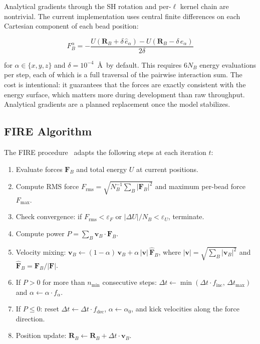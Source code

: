 ﻿\documentclass[11pt]{article}
\begin{document}
Analytical gradients through the SH rotation and per-$\ell$ kernel chain are
nontrivial. The current implementation uses central finite differences on each
Cartesian component of each bead position:

\begin{equation}
\label{eq:fd-forces}
  F_{B}^{\alpha}
    = -\frac{U(\mathbf{R}_B + \delta\,\hat{e}_\alpha)
           - U(\mathbf{R}_B - \delta\,\hat{e}_\alpha)}{2\delta}
\end{equation}

for $\alpha \in \{x, y, z\}$ and $\delta = 10^{-4}$~\AA\ by default. This
requires $6N_B$ energy evaluations per step, each of which is a full
traversal of the pairwise interaction sum. The cost is intentional: it
guarantees that the forces are exactly consistent with the energy surface,
which matters more during development than raw throughput. Analytical
gradients are a planned replacement once the model stabilizes.

\subsection{FIRE Algorithm}

The FIRE procedure~\cite{Bitzek2006} adapts the following steps at each
iteration $t$:

\begin{enumerate}[label=\arabic*.]
  \item Evaluate forces $\mathbf{F}_B$ and total energy $U$ at current
        positions.
  \item Compute RMS force $F_{\mathrm{rms}} = \sqrt{N_B^{-1} \sum_B |\mathbf{F}_B|^2}$
        and maximum per-bead force $F_{\max}$.
  \item Check convergence: if $F_{\mathrm{rms}} < \varepsilon_F$ or
        $|\Delta U|/N_B < \varepsilon_U$, terminate.
  \item Compute power $P = \sum_B \mathbf{v}_B \cdot \mathbf{F}_B$.
  \item Velocity mixing:
        $\mathbf{v}_B \leftarrow
          (1 - \alpha)\,\mathbf{v}_B
          + \alpha\,|\mathbf{v}|\,\hat{\mathbf{F}}_B$,
        where $|\mathbf{v}| = \sqrt{\sum_B |\mathbf{v}_B|^2}$ and
        $\hat{\mathbf{F}}_B = \mathbf{F}_B / |\mathbf{F}|$.
  \item If $P > 0$ for more than $n_{\min}$ consecutive steps:
        $\Delta t \leftarrow \min(\Delta t \cdot f_{\mathrm{inc}},\, \Delta t_{\max})$
        and $\alpha \leftarrow \alpha \cdot f_\alpha$.
  \item If $P \leq 0$: reset $\Delta t \leftarrow \Delta t \cdot f_{\mathrm{dec}}$,
        $\alpha \leftarrow \alpha_0$, and kick velocities along the force
        direction.
  \item Position update: $\mathbf{R}_B \leftarrow \mathbf{R}_B + \Delta t \cdot \mathbf{v}_B$.
\end{enumerate}
\end{document}
